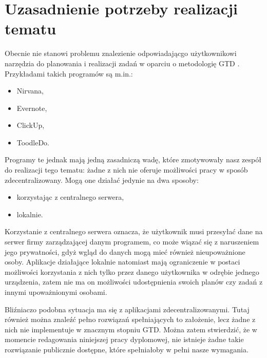 \section{Uzasadnienie potrzeby realizacji tematu}
Obecnie nie stanowi problemu znalezienie odpowiadającgo użytkownikowi narzędzia do planowania i realizacji zadań w oparciu o metodologię GTD \cite{GTD-apps}. Przykładami takich programów są m.in.:
\begin{itemize}
    \item Nirvana,
    \item Evernote,
    \item ClickUp,
    \item ToodleDo.
\end{itemize}
Programy te jednak mają jedną zasadniczą wadę, które zmotywowały nasz zespół do realizacji tego tematu: żadne z nich nie oferuje możliwości pracy w sposób zdecentralizowany. Mogą one działać jedynie na dwa sposoby:
\begin{itemize}
    \item korzystając z centralnego serwera,
    \item lokalnie.
\end{itemize}
Korzystanie z centralnego serwera oznacza, że użytkownik musi przesyłać dane na serwer firmy zarządzającej danym programem, co może wiązać się z naruszeniem jego prywatności, gdyż wgląd do danych mogą mieć również nieupoważnione osoby. Aplikacje działające lokalnie natomiast mają ograniczenie w postaci możliwości korzystania z nich tylko przez danego użytkownika w odrębie jednego urządzenia, zatem nie ma on możliwości udostępnienia swoich planów czy zadań z innymi upoważnionymi osobami.
\par Bliźniaczo podobna sytuacja ma się z aplikacjami zdecentralizowanymi. Tutaj również można znaleźć pełno rozwiązań spełniających to założenie, lecz żadne z nich nie implementuje w znacznym stopniu GTD. Można zatem stwierdzić, że w momencie redagowania niniejszej pracy dyplomowej, nie istnieje żadne takie rozwiązanie publicznie dostępne, które spełniałoby w pełni nasze wymagania.

